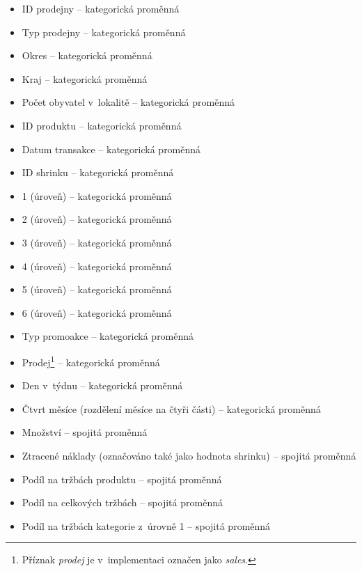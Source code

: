 \begin{itemize}
    \itemsep-0.34em
    \item ID prodejny -- kategorická proměnná
    \item Typ prodejny -- kategorická proměnná
    \item Okres -- kategorická proměnná
    \item Kraj -- kategorická proměnná
    \item Počet obyvatel v~lokalitě -- kategorická proměnná
    \item ID produktu -- kategorická proměnná
    \item Datum transakce -- kategorická proměnná
    \item ID shrinku -- kategorická proměnná
    \item 1 (úroveň) -- kategorická proměnná
    \item 2 (úroveň) -- kategorická proměnná
    \item 3 (úroveň) -- kategorická proměnná
    \item 4 (úroveň) -- kategorická proměnná
    \item 5 (úroveň) -- kategorická proměnná
    \item 6 (úroveň) -- kategorická proměnná
    \item Typ promoakce -- kategorická proměnná
    \item Prodej\footnote{Příznak \emph{prodej} je v~implementaci označen jako \emph{sales}.} -- kategorická proměnná
    \item Den v~týdnu -- kategorická proměnná
    \item Čtvrt měsíce (rozdělení měsíce na čtyři části) -- kategorická proměnná
    \item Množství -- spojitá proměnná
    \item Ztracené náklady (označováno také jako hodnota shrinku) -- spojitá proměnná
    \item Podíl na tržbách produktu -- spojitá proměnná
    \item Podíl na celkových tržbách -- spojitá proměnná
    \item Podíl na tržbách kategorie z~úrovně 1 -- spojitá proměnná
\end{itemize}


